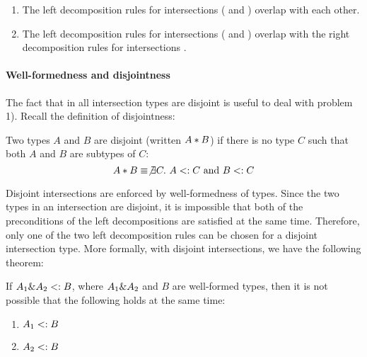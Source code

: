 \begin{enumerate}

\item The left decomposition rules for intersections (
and ) overlap with each other.

\item The left decomposition rules for intersections (
and ) overlap with the right decomposition rules for
intersections .

\end{enumerate}

\paragraph{Well-formedness and disjointness} 
The fact that in \name all intersection types are disjoint is useful to deal
with problem 1). Recall the definition of disjointness:

\begin{definition}\label{def:simple_dis}
  Two types $A$ and $B$ are disjoint
  (written $A * B$) if there is no type $C$ such that both $A$ and $B$ are
  subtypes of $C$:
  \[A * B \equiv \not\exists C.~A <: C~\text{and}~B <: C\]
\end{definition}

Disjoint intersections are enforced by well-formedness of types.
Since the two types in an intersection are disjoint, it is impossible
that both of the preconditions of the left decompositions are
satisfied at the same time. Therefore, only one of the two left
decomposition rules can be chosen for a disjoint intersection
type. More formally, with disjoint intersections, we have the
following theorem:

\begin{lemma}
  \label{lemma:unique-subtype-contributor}

  If $A_1 \& A_2 <: B$, where $A_1 \& A_2$ and $B$ are well-formed types,
  then it is not possible that the following holds at the same time:
  \begin{enumerate}
    \item $A_1 <: B$
    \item $A_2 <: B$
  \end{enumerate}
\end{lemma}


